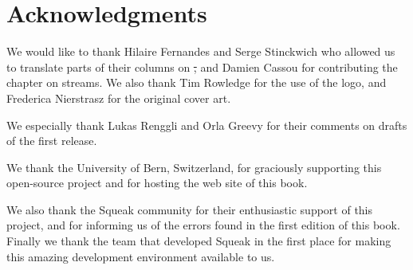 \documentclass[a4paper,10pt,twoside]{book}
\begin{document}







\section*{Acknowledgments}

We would like to thank Hilaire Fernandes and Serge Stinckwich who allowed us to translate parts of their columns on \st, and Damien Cassou for contributing the chapter on streams.
We also thank Tim Rowledge for the use of the \sq logo, and Frederica Nierstrasz for the original cover art.

We especially thank Lukas Renggli and Orla Greevy for their comments on drafts of the first release.

We thank the University of Bern, Switzerland, for graciously supporting this open-source project and for hosting the web site of this book.

We also thank the Squeak community for their enthusiastic support of this project, and for informing us of the errors found in the first edition of this book.
Finally we thank the team that developed Squeak in the first place for making this amazing development environment available to us.

\ifx\wholebook\relax\else
   
   
\end{document}
